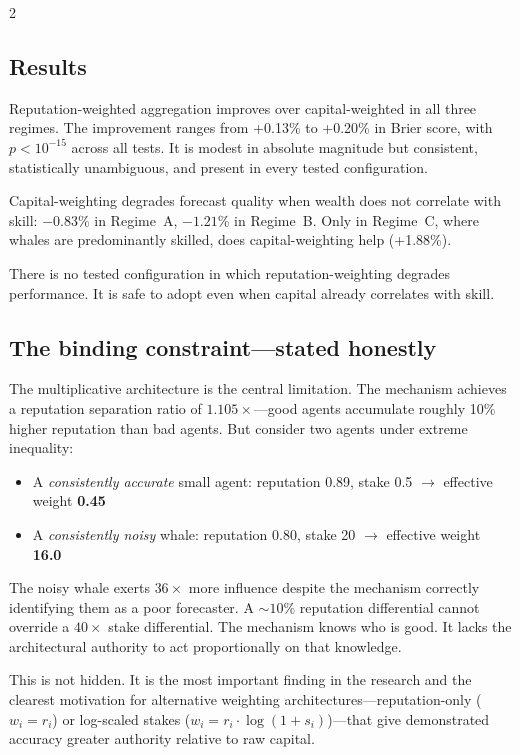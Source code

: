 \documentclass[9pt,oneside]{amsart}
\begin{document}
\begin{multicols}{2}
\subsection{Results}

Reputation-weighted aggregation improves over capital-weighted in all three regimes. The improvement ranges from +0.13\% to +0.20\% in Brier score, with $p < 10^{-15}$ across all tests. It is modest in absolute magnitude but consistent, statistically unambiguous, and present in every tested configuration.

Capital-weighting degrades forecast quality when wealth does not correlate with skill: $-0.83\%$ in Regime~A, $-1.21\%$ in Regime~B. Only in Regime~C, where whales are predominantly skilled, does capital-weighting help (+1.88\%).

There is no tested configuration in which reputation-weighting degrades performance. It is safe to adopt even when capital already correlates with skill.

\subsection{The binding constraint---stated honestly}

The multiplicative architecture is the central limitation. The mechanism achieves a reputation separation ratio of $1.105\times$---good agents accumulate roughly 10\% higher reputation than bad agents. But consider two agents under extreme inequality:

\begin{itemize}[nosep]
  \item A \emph{consistently accurate} small agent: reputation 0.89, stake 0.5 $\rightarrow$ effective weight \textbf{0.45}
  \item A \emph{consistently noisy} whale: reputation 0.80, stake 20 $\rightarrow$ effective weight \textbf{16.0}
\end{itemize}

The noisy whale exerts $36\times$ more influence despite the mechanism correctly identifying them as a poor forecaster. A ${\sim}10\%$ reputation differential cannot override a $40\times$ stake differential. The mechanism knows who is good. It lacks the architectural authority to act proportionally on that knowledge.

This is not hidden. It is the most important finding in the research and the clearest motivation for alternative weighting architectures---reputation-only ($w_i = r_i$) or log-scaled stakes ($w_i = r_i \cdot \log(1 + s_i)$)---that give demonstrated accuracy greater authority relative to raw capital.


\end{multicols}
\end{document}
